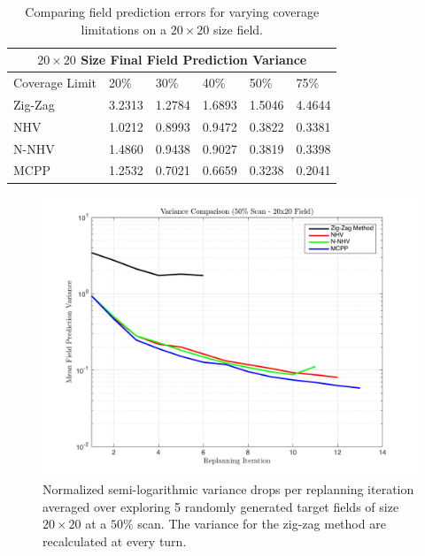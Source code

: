 \begin{table}[ht!]
\centering
	\begin{tabular}{ |p{3cm}||p{1cm}|p{1cm}|p{1cm}|p{1cm}|p{1cm}|  }
		\hline
		\multicolumn{6}{|c|}{$20 \times 20$ Size Final Field Prediction Variance} \\
		\hline
		Coverage Limit & 20\% & 30\% & 40\% & 50\% & 75\% \\
		\hline
		Zig-Zag        & 3.2313 & 1.2784 & 1.6893 & 1.5046 & 4.4644 \\
		NHV            & 1.0212 & 0.8993 & 0.9472 & 0.3822 & 0.3381 \\
		N-NHV          & 1.4860 & 0.9438 & 0.9027 & 0.3819 & 0.3398 \\
		MCPP           & 1.2532 & 0.7021 & 0.6659 & 0.3238 & 0.2041 \\
		\hline
	\end{tabular}
	\caption{Comparing field prediction errors for varying coverage limitations on a $20 \times 20$ size field.}
    \label{tab:20fieldvar}
\end{table}

\begin{figure}[hb!]
	\centering
	\includegraphics[width=0.8\linewidth]{figures/vars_semilogy_20x20_50percent_5runs.png}
    \captionsetup{skip=0.20\baselineskip,size=footnotesize}
	\caption{Normalized semi-logarithmic variance drops per replanning iteration averaged over exploring 5 randomly generated target fields of size $20 \times 20$ at a $50\%$ scan. The variance for the zig-zag method are recalculated at every turn.}
\end{figure}



